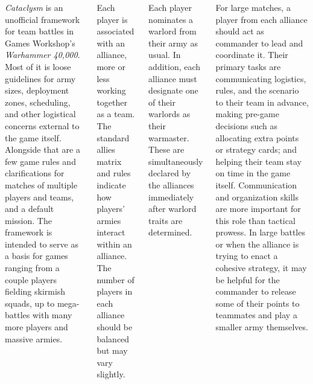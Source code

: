 \documentclass{40k}
\begin{document}

\begin{columns}

  \emph{Cataclysm} is an unofficial framework for team battles in
  Games Workshop's \emph{Warhammer 40,000}.  Most of it is loose
  guidelines for army sizes, deployment zones, scheduling, and other
  logistical concerns external to the game itself.  Alongside that are
  a few game rules and clarifications for matches of multiple players
  and teams, and a default mission.  The framework is intended to
  serve as a basis for games ranging from a couple players fielding
  skirmish squads, up to mega-battles with many more players and
  massive armies.

%

Each player is associated with an alliance, more or less working
together as a team.  The standard allies matrix and rules indicate how
players' armies interact within an alliance.  The number of players in
each alliance should be balanced but may vary slightly.

Each player nominates a warlord from their army as usual.  In
addition, each alliance must designate one of their warlords as their
warmaster.  These are simultaneously declared by the alliances
immediately after warlord traits are determined.


For large matches, a player from each alliance should act as commander
to lead and coordinate it.  Their primary tasks are communicating
logistics, rules, and the scenario to their team in advance, making
pre-game decisions such as allocating extra points or strategy cards;
and helping their team stay on time in the game itself.  Communication
and organization skills are more important for this role than tactical
prowess.  In large battles or when the alliance is trying to enact a
cohesive strategy, it may be helpful for the commander to release some
of their points to teammates and play a smaller army themselves.

%


\end{columns}
\end{document}
